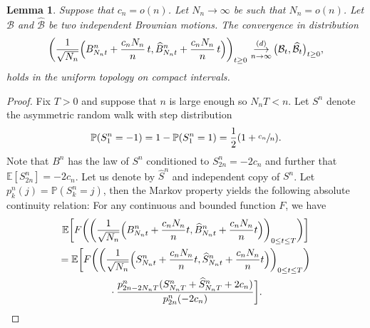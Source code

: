 \documentclass[JEP,XML,SOM,Unicode,NoFloatCountersInSection,NoEqCountersInSection]{cedram}
\theoremstyle{plain}
\newtheorem{lemma}[theorem]{Lemma}
\theoremstyle{definition}
\theoremstyle{remark}
\renewcommand{\P}{\mathbb{P}}
\newcommand{\E}{\mathbb{E}}
\newcommand{\cvloi}[1][n]{\,\mathop{\longrightarrow}^{(d)}_{#1 \to \infty}\,}
\begin{document}
\begin{lemma}\label{lem:cv_recentre_brownien}
Suppose that $c_n = o(n)$. Let $N_{n}\to \infty$ be such that $N_{n} = o(n)$. Let $\mathcal{B}$ and $\widehat{ \mathcal{B}}$ be two independent Brownian motions.
The convergence in distribution\vspace*{-3pt}\enlargethispage{.5\baselineskip}%
\[
\biggl(\frac{1}{\sqrt{N_{n}}} \Bigl(B^{n}_{N_{n}t}+\frac{c_{n} N_{n}}{n}\,t, \widehat{B}^{n}_{N_{n}t}+\frac{c_{n} N_{n}}{n}\,t\Bigr)\biggr)_{t \ge 0}
\cvloi \bigl(\mathcal{B}_{t}, \widehat{ \mathcal{B}}_{t}\bigr)_{t \ge 0},
\]
holds in the uniform topology on compact intervals.
\end{lemma}

\begin{proof}
Fix $T>0$ and suppose that $n$ is large enough so $N_n T < n$. Let $S^{n}$ denote the asymmetric random walk with step distribution\vspace*{-3pt}
\[
\P(S^{n}_{1} = -1) = 1-\P(S^{n}_{1} = 1) = \frac{1}{2}(1+\sfrac{c_{n}}{n}).
\]
Note that $B^{n}$ has the law of $S^{n}$ conditioned to $S^n_{2n} = -2c_{n}$ and further that $\E[S^{n}_{2n}] = -2c_{n}$. Let us denote by $\widehat{S}^{n}$ and independent copy of $S^{n}$.
Let $p^n_k(j) = \P(S^n_k = j)$, then the Markov property yields the following absolute continuity relation: For any continuous and bounded function $F$, we have\vspace*{-5pt}
\begin{multline*}
\E\biggl[F\biggl(\biggl(\frac{1}{\sqrt{N_{n}}} \Bigl(B^{n}_{N_{n}t}+\frac{c_{n} N_{n}}{n}t, \widehat{B}^{n}_{N_{n}t}+\frac{c_{n} N_{n}}{n}t\Bigr)\biggr)_{0 \le t \le T}\biggr) \biggr]
\\
= \E\biggl[F\biggl(\biggl(\frac{1}{\sqrt{N_{n}}} \Bigl(S^{n}_{N_{n}t}+\frac{c_{n} N_{n}}{n}t, \widehat{S}^{n}_{N_{n}t}+\frac{c_{n} N_{n}}{n}t\Bigr)\biggr)_{0 \le t \le T}\biggr)\\
{}\cdot\frac{p^n_{2n-2N_{n}T}(S^{n}_{N_{n}T}+\widehat{S}^{n}_{N_{n}T}+2c_{n})}{p^n_{2n}(-2c_{n})}\biggr].
\end{multline*}


\end{proof}
\end{document}
